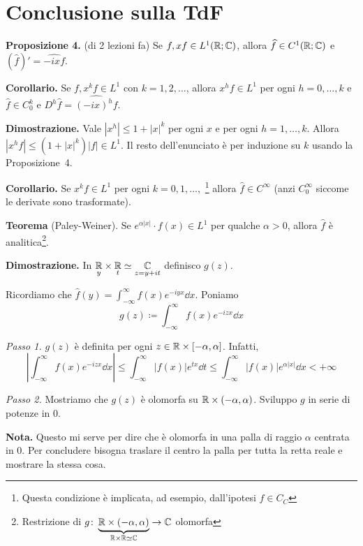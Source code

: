 \section{Conclusione sulla TdF}

\textbf{Proposizione 4.} (di 2 lezioni fa)
Se $f,xf \in L^1(\mathbb R;\mathbb C)$, allora $\widehat{f} \in C^1(\mathbb R;\mathbb C)$ e $(\hat{f})' = \hat{-ixf}$.

\textbf{Corollario.} Se $f,x^kf \in L^1$ con $k=1,2,\ldots$, allora $x^hf \in L^1$ per ogni $h=0,\ldots,k$ e $\hat{f} \in C_0^k$ e $D^h \hat{f} = \hat{(-ix)^h f}$.

\textbf{Dimostrazione.} Vale $|x^h| \leq 1 + |x|^k$ per ogni $x$ e per ogni $h=1,\ldots,k$.
Allora $|x^hf| \leq (1 + |x|^k)|f| \in L^1$.
Il resto dell'enunciato è per induzione su $k$ usando la Proposizione~4.

\vs

\textbf{Corollario.} Se $x^k f \in L^1$ per ogni $k=0,1,\ldots,$ \footnote{Questa condizione è implicata, ad esempio, dall'ipotesi $f \in C_C$} allora $\hat{f} \in C^\infty$ (anzi $C_0^\infty$ siccome le derivate sono trasformate).

\vs

\textbf{Teorema} (Paley-Weiner).
Se $e^{\alpha |x|} \cdot f(x) \in L^1$ per qualche $\alpha > 0$, allora $\hat{f}$ è analitica\footnote{Restrizione di $g \colon \underbrace{\mathbb R \times (-\alpha,\alpha)}_{\mathbb R \times \mathbb R \simeq \mathbb C} \to \mathbb C$ olomorfa}.

\textbf{Dimostrazione.} In $\underset{y}{\mathbb R} \times \underset{t}{\mathbb R} \simeq \underset{z=y+it}{\mathbb C}$ definisco $g(z)$.

Ricordiamo che $\hat{f}(y) = \int_{-\infty}^\infty f(x) e^{-iyx} \dd x $.
Poniamo
%
$$
	g(z) \coloneqq \int_{-\infty}^\infty f(x) e^{-izx} \dd x 
$$
%

\textit{Passo 1.} $g(z)$ è definita per ogni $z \in \mathbb R \times [-\alpha,\alpha]$.
Infatti,
%
$$
	\left| \int_{-\infty}^\infty f(x) e^{-izx} \dd x  \right|
	\leq \int_{-\infty}^\infty |f(x)| e^{tx} \dd t
	\leq \int_{-\infty}^\infty |f(x)| e^{\alpha |x|} \dd x < +\infty
$$
%

\textit{Passo 2.} Mostriamo che $g(z)$ è olomorfa su $\mathbb R \times (-\alpha,\alpha)$.
Sviluppo $g$ in serie di potenze in $0$.

\textbf{Nota.} Questo mi serve per dire che è olomorfa in una palla di raggio $\alpha $ centrata in $0$. Per concludere bisogna traslare il centro la palla per tutta la retta reale e mostrare la stessa cosa.

